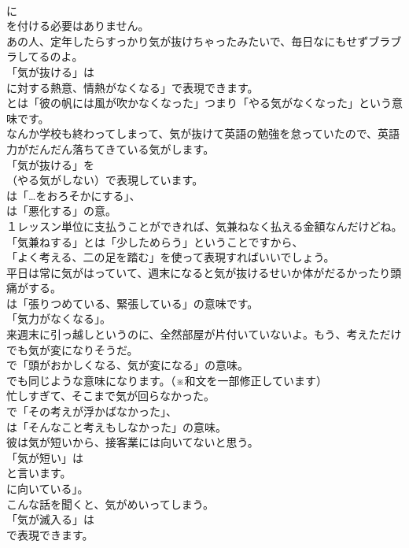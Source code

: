 \documentclass[8pt]{extreport}
\begin{document}
\begin{CJK}{UTF8}{min}
\\	に
\\	を付ける必要はありません。	
\\	あの人、定年したらすっかり気が抜けちゃったみたいで、毎日なにもせずブラブラしてるのよ。 
\\	「気が抜ける」は
\\	に対する熱意、情熱がなくなる」で表現できます。
\\	とは「彼の帆には風が吹かなくなった」つまり「やる気がなくなった」という意味です。	
\\	なんか学校も終わってしまって、気が抜けて英語の勉強を怠っていたので、英語力がだんだん落ちてきている気がします。 
\\	「気が抜ける」を 
\\	（やる気がしない）で表現しています。
\\	は「…をおろそかにする」、
\\	は「悪化する」の意。	
\\	１レッスン単位に支払うことができれば、気兼ねなく払える金額なんだけどね。 
\\	「気兼ねする」とは「少しためらう」ということですから、
\\	「よく考える、二の足を踏む」を使って表現すればいいでしょう。	
\\	平日は常に気がはっていて、週末になると気が抜けるせいか体がだるかったり頭痛がする。 
\\	は「張りつめている、緊張している」の意味です。
\\	「気力がなくなる」。	
\\	来週末に引っ越しというのに、全然部屋が片付いていないよ。もう、考えただけでも気が変になりそうだ。 
\\	で「頭がおかしくなる、気が変になる」の意味。
\\	でも同じような意味になります。（※和文を一部修正しています）	
\\	忙しすぎて、そこまで気が回らなかった。 
\\	で「その考えが浮かばなかった」、
\\	は「そんなこと考えもしなかった」の意味。	
\\	彼は気が短いから、接客業には向いてないと思う。 
\\	「気が短い」は
\\	と言います。
\\	に向いている」。	
\\	こんな話を聞くと、気がめいってしまう。 
\\	「気が滅入る」は
\\	で表現できます。

\end{CJK}
\end{document}
